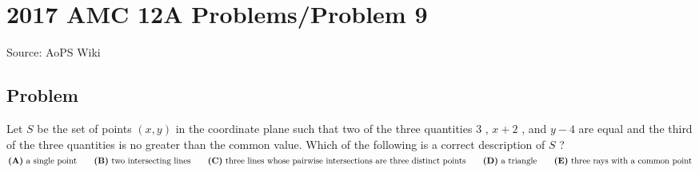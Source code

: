 \documentclass[12pt]{article}
\begin{document}
\section*{{2017 AMC 12A Problems/Problem 9}}
Source: AoPS Wiki

\subsection*{Problem}
Let $S$ be the set of points $(x,y)$ in the coordinate plane such that two of the three quantities $3$ , $x+2$ , and $y-4$ are equal and the third of the three quantities is no greater than the common value. Which of the following is a correct description of $S$ ? $\textbf{(A)}\ \text{a single point} \qquad\textbf{(B)}\ \text{two intersecting lines} \\ \qquad\textbf{(C)}\ \text{three lines whose pairwise intersections are three distinct points} \\ \qquad\textbf{(D)}\ \text{a triangle}\qquad\textbf{(E)}\ \text{three rays with a common point}$
\end{document}

